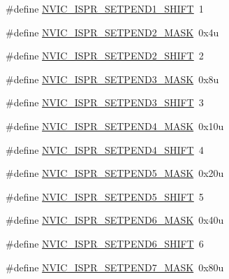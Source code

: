 \begin{DoxyCompactItemize}
\item 
\#define \hyperlink{group___n_v_i_c___register___masks_ga07924e4e3ad828e3e3bc441910245c7a}{N\+V\+I\+C\+\_\+\+I\+S\+P\+R\+\_\+\+S\+E\+T\+P\+E\+N\+D1\+\_\+\+S\+H\+I\+FT}~1
\item 
\#define \hyperlink{group___n_v_i_c___register___masks_gaef9f99ad6dacb96dc998b3853bb03816}{N\+V\+I\+C\+\_\+\+I\+S\+P\+R\+\_\+\+S\+E\+T\+P\+E\+N\+D2\+\_\+\+M\+A\+SK}~0x4u
\item 
\#define \hyperlink{group___n_v_i_c___register___masks_ga3bdfd2411abf6ca642fbe98c9f6a6530}{N\+V\+I\+C\+\_\+\+I\+S\+P\+R\+\_\+\+S\+E\+T\+P\+E\+N\+D2\+\_\+\+S\+H\+I\+FT}~2
\item 
\#define \hyperlink{group___n_v_i_c___register___masks_gad895fb77ca4e4dc9f722379facf33d75}{N\+V\+I\+C\+\_\+\+I\+S\+P\+R\+\_\+\+S\+E\+T\+P\+E\+N\+D3\+\_\+\+M\+A\+SK}~0x8u
\item 
\#define \hyperlink{group___n_v_i_c___register___masks_gaa4664cfd7192bd1da71c65a9b0e8f0b5}{N\+V\+I\+C\+\_\+\+I\+S\+P\+R\+\_\+\+S\+E\+T\+P\+E\+N\+D3\+\_\+\+S\+H\+I\+FT}~3
\item 
\#define \hyperlink{group___n_v_i_c___register___masks_ga1705b6e7749ede0b1d9dbb90da1c90bc}{N\+V\+I\+C\+\_\+\+I\+S\+P\+R\+\_\+\+S\+E\+T\+P\+E\+N\+D4\+\_\+\+M\+A\+SK}~0x10u
\item 
\#define \hyperlink{group___n_v_i_c___register___masks_ga9db387ed1365638640681b56bde84784}{N\+V\+I\+C\+\_\+\+I\+S\+P\+R\+\_\+\+S\+E\+T\+P\+E\+N\+D4\+\_\+\+S\+H\+I\+FT}~4
\item 
\#define \hyperlink{group___n_v_i_c___register___masks_ga0455a2fad9235699fdf019b6a0aa3a38}{N\+V\+I\+C\+\_\+\+I\+S\+P\+R\+\_\+\+S\+E\+T\+P\+E\+N\+D5\+\_\+\+M\+A\+SK}~0x20u
\item 
\#define \hyperlink{group___n_v_i_c___register___masks_ga22f002e691340afab962e9af6120962e}{N\+V\+I\+C\+\_\+\+I\+S\+P\+R\+\_\+\+S\+E\+T\+P\+E\+N\+D5\+\_\+\+S\+H\+I\+FT}~5
\item 
\#define \hyperlink{group___n_v_i_c___register___masks_ga81e0cb946d42d3a019c816ec7763601c}{N\+V\+I\+C\+\_\+\+I\+S\+P\+R\+\_\+\+S\+E\+T\+P\+E\+N\+D6\+\_\+\+M\+A\+SK}~0x40u
\item 
\#define \hyperlink{group___n_v_i_c___register___masks_gadf19b94b205cd9035caa2e28fff6b3b0}{N\+V\+I\+C\+\_\+\+I\+S\+P\+R\+\_\+\+S\+E\+T\+P\+E\+N\+D6\+\_\+\+S\+H\+I\+FT}~6
\item 
\#define \hyperlink{group___n_v_i_c___register___masks_ga0f07e5fca5a760d38d821349b8a19b50}{N\+V\+I\+C\+\_\+\+I\+S\+P\+R\+\_\+\+S\+E\+T\+P\+E\+N\+D7\+\_\+\+M\+A\+SK}~0x80u

\end{DoxyCompactItemize}

